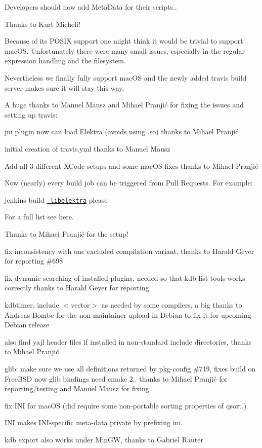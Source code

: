 Developers should now add Meta\+Data for their scripts..

Thanks to Kurt Micheli!

Because of its P\+O\+S\+IX support one might think it would be trivial to support mac\+OS. Unfortunately there were many small issues, especially in the regular expression handling and the filesystem.

Nevertheless we finally fully support mac\+OS and the newly added travis build server makes sure it will stay this way.

A huge thanks to Manuel Mausz and Mihael Pranjić for fixing the issues and setting up travis\+:


\begin{DoxyItemize}
\item jni plugin now can load Elektra (avoids using {\ttfamily .so}) thanks to Mihael Pranjić
\item initial creation of travis.\+yml thanks to Manuel Mausz
\item Add all 3 different X\+Code setups and some mac\+OS fixes thanks to Mihael Pranjić
\end{DoxyItemize}

Now (nearly) every build job can be triggered from Pull Requests. For example\+:


\begin{DoxyItemize}
\item jenkins build \href{https://build.libelektra.org/job/libelektra/}{\texttt{ libelektra}} please
\end{DoxyItemize}

For a full list see here.

Thanks to Mihael Pranjić for the setup!


\begin{DoxyItemize}
\item fix inconsistency with one excluded compilation variant, thanks to Harald Geyer for reporting \#698
\item fix dynamic searching of installed plugins, needed so that kdb list-\/tools works correctly thanks to Harald Geyer for reporting
\item kdbtimer, {\ttfamily include $<$vector$>$} as needed by some compilers, a big thanks to Andreas Bombe for the non-\/maintainer upload in Debian to fix it for upcoming Debian release
\item also find yajl header files if installed in non-\/standard include directories, thanks to Mihael Pranjić
\item glib\+: make sure we use all definitions returned by pkg-\/config \#719, fixes build on Free\+B\+SD now glib bindings need cmake 2.. thanks to Mihael Pranjić for reporting/testing and Manuel Mausz for fixing
\item fix I\+NI for mac\+OS (did require some non-\/portable sorting properties of {\ttfamily qsort}.)
\item I\+NI makes I\+N\+I-\/specific meta-\/data private by prefixing {\ttfamily ini}.
\item {\ttfamily kdb export} also works under Min\+GW, thanks to Gabriel Rauter
\end{DoxyItemize}


